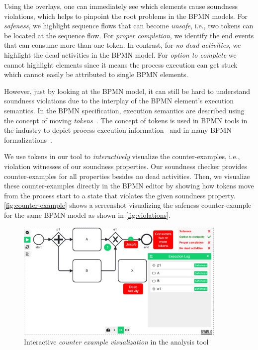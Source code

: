 \documentclass[runningheads]{llncs}
\begin{document}
Using the overlays, one can immediately see which elements cause soundness violations, which helps to pinpoint the root problems in the BPMN models.
For \textit{safeness}, we highlight sequence flows that can become \textit{unsafe}, i.e., two tokens can be located at the sequence flow.
For \textit{proper completion}, we identify the end events that can consume more than one token.
In contrast, for \textit{no dead activities}, we highlight the dead activities in the BPMN model.
For \textit{option to complete} we cannot highlight elements since it means the process execution can get stuck which cannot easily be attributed to single BPMN elements.

However, just by looking at the BPMN model, it can still be hard to understand soundness violations due to the interplay of the BPMN element's execution semantics.
In the BPMN specification, execution semantics are described using the concept of moving \textit{tokens}~\cite{objectmanagementgroupBusinessProcessModel2013}.
The concept of tokens is used in BPMN tools in the industry to depict process execution information~\cite{camundaservicesgmbhBpmnjsTokenSimulation2024} and in many BPMN formalizations~\cite{vangorpVisualTokenbasedFormalization2013,krauterFormalizationAnalysisBPMN2023,houhouFirstOrderLogicVerification2022,corradiniFormalisingAnimatingMultiple2022}.

We use tokens in our tool to \textit{interactively} visualize the counter-examples, i.e., violation witnesses of our soundness properties.
Our soundness checker provides counter-examples for all properties besides no dead activities.
Then, we visualize these counter-examples directly in the BPMN editor by showing how tokens move from the process start to a state that violates the given soundness property.
\autoref{fig:counter-example} shows a screenshot visualizing the safeness counter-example for the same BPMN model as shown in \autoref{fig:violations}.

\begin{figure}[ht]
	\centering
	\includegraphics[width=0.9\textwidth]{images/counter-example}
	\caption{Interactive \textit{counter example visualization} in the analysis tool}
	\label{fig:counter-example}
\end{figure}
\end{document}
